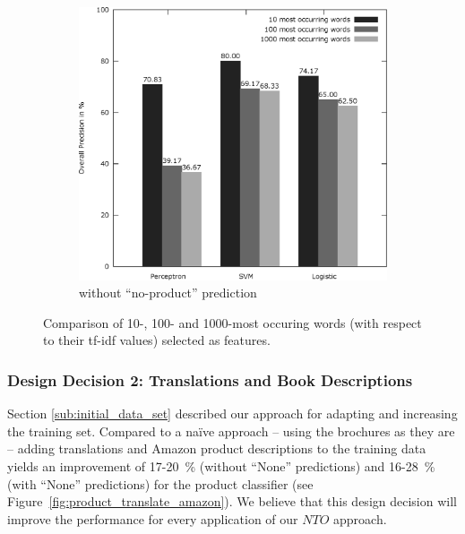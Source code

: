 \begin{figure}[h!]
\begin{subfigure}[t]{0.5\textwidth}
		\includegraphics[width=\textwidth]{figures/product_feature_selection_without_none.eps}
		\caption{without ``no-product'' prediction}
	\end{subfigure}
	\caption{Comparison of 10-, 100- and 1000-most occuring words (with respect to their tf-idf values) selected as features.}
	\label{fig:product_feature_selection}
\end{figure}

\subsubsection{Design Decision 2: Translations and Book Descriptions}
Section \ref{sub:initial_data_set} described our approach for adapting and increasing the training set.
Compared to a na\"ive approach -- using the brochures as they are -- adding translations and Amazon product descriptions to the training data yields an improvement of 17-20~\% (without ``None'' predictions) and 16-28~\% (with ``None'' predictions) for the product classifier (see Figure~\ref{fig:product_translate_amazon}).
We believe that this design decision will improve the performance for every application of our $NTO$ approach.

